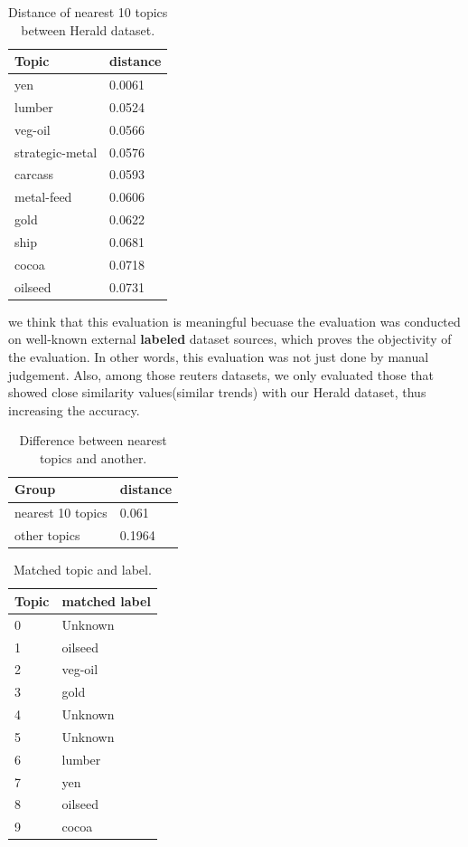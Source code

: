 \begin{table}[!htbp]
  \begin{tabular}{l|l}
  Topic & distance \\ \hline
  yen & 0.0061 \\
  lumber & 0.0524 \\
  veg-oil & 0.0566 \\
  strategic-metal & 0.0576 \\
  carcass & 0.0593 \\
  metal-feed & 0.0606 \\
  gold & 0.0622 \\
  ship & 0.0681 \\
  cocoa & 0.0718 \\
  oilseed & 0.0731
  \end{tabular}
  \caption{Distance of nearest 10 topics between Herald dataset.}
  \label{table:topicdistance}
\end{table}

we think that this evaluation is meaningful becuase the evaluation was conducted on
well-known external \textbf{labeled} dataset sources, which proves the objectivity
of the evaluation. In other words, this evaluation was not just done by manual
judgement. Also, among those reuters datasets, we only evaluated those
that showed close similarity values(similar trends) with our Herald dataset, thus increasing the
accuracy.


\begin{table}[!htbp]
  \begin{tabular}{l|l}
  Group & distance \\ \hline
  nearest 10 topics & 0.061 \\
  other topics & 0.1964
  \end{tabular}
  \caption{Difference between nearest topics and another.}
  \label{table:groupdistance}
\end{table}

\begin{table}[!htbp]
  \begin{tabular}{l|l}
      Topic & matched label \\ \hline
      0 & Unknown \\
      1 & oilseed \\
      2 & veg-oil \\
      3 & gold \\
      4 & Unknown \\
      5 & Unknown \\
      6 & lumber \\
      7 & yen \\
      8 & oilseed \\
      9 & cocoa \\
  \end{tabular}
  \caption{Matched topic and label.}
  \label{table:matchedtopic}
\end{table}



